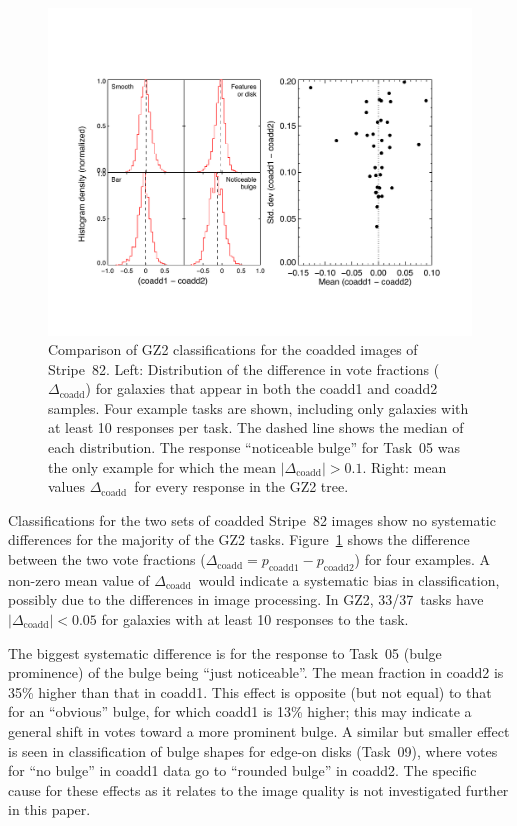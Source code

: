 \documentclass[useAMS,usenatbib]{mn2e}
\newcommand{\dcoadd}{$\Delta_\mathrm{coadd}$}
\begin{document}
\begin{figure}
\includegraphics[angle=0,width=7.0in]{figures/stripe82_coadd_compare.pdf}
\caption{Comparison of GZ2 classifications for the coadded images of Stripe~82. Left: Distribution of the difference in vote fractions (\dcoadd) for galaxies that appear in both the coadd1 and coadd2 samples. Four example tasks are shown, including only galaxies with at least 10 responses per task. The dashed line shows the median of each distribution. The response ``noticeable bulge'' for Task~05 was the only example for which the mean $|\Delta_\mathrm{coadd}| > 0.1$. Right: mean values \dcoadd~for every response in the GZ2 tree. 
\label{fig-stripe82_compare}}
\end{figure}

Classifications for the two sets of coadded Stripe~82 images show no systematic differences for the majority of the GZ2 tasks. Figure~\ref{fig-stripe82_compare} shows the difference between the two vote fractions ($\Delta_\mathrm{coadd} = p_\mathrm{coadd1} - p_\mathrm{coadd2}$) for four examples. A non-zero mean value of \dcoadd~would indicate a systematic bias in classification, possibly due to the differences in image processing. In GZ2, 33/37~tasks have $|\Delta_\mathrm{coadd}| < 0.05$ for galaxies with at least 10 responses to the task. 

The biggest systematic difference is for the response to Task~05 (bulge prominence) of the bulge being ``just noticeable''. The mean fraction in coadd2 is 35\% higher than that in coadd1. This effect is opposite (but not equal) to that for an ``obvious'' bulge, for which coadd1 is 13\% higher; this may indicate a general shift in votes toward a more prominent bulge. A similar but smaller effect is seen in classification of bulge shapes for edge-on disks (Task~09), where votes for ``no bulge'' in coadd1 data go to ``rounded bulge'' in coadd2. The specific cause for these effects as it relates to the image quality is not investigated further in this paper. 
\end{document}
